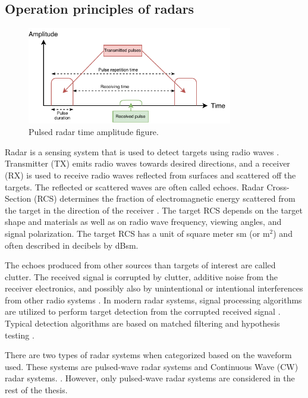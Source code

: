 \documentclass[english, 12pt, a4paper, elec, utf8, a-1b, online]{aaltothesis}
\begin{document}
\subsection{Operation principles of radars} \label{sec:radar_opertaion_principle}

\begin{figure}[htb]
    \centering
    \includegraphics[width=0.8\textwidth]{figures/background/pulsed_radar.pdf}
    \caption{Pulsed radar time amplitude figure.}
    \label{fig:pulsed_radar}
\end{figure}

Radar is a sensing system that is used to detect targets using radio waves \cite{Curry2011}.
Transmitter (TX) emits radio waves towards desired directions, and a receiver (RX) is used to receive radio waves reflected from surfaces and scattered off the targets. 
The reflected or scattered waves are often called echoes.
Radar Cross-Section (RCS) determines the fraction of electromagnetic energy scattered from the target in the direction of the receiver \cite{Curry2011}.
The target RCS depends on the target shape and materials as well as on radio wave frequency, viewing angles, and signal polarization.
The target RCS has a unit of square meter sm (or m$^2$) and often described in decibels by dBsm.

The echoes produced from other sources than targets of interest are called clutter.
The received signal is corrupted by clutter, additive noise from the receiver electronics, and possibly also by unintentional or intentional interferences from other radio systems \cite{Curry2011}.
In modern radar systems, signal processing algorithms are utilized to perform target detection from the corrupted received signal \cite{Mahafza2015}.
Typical detection algorithms are based on matched filtering and hypothesis testing \cite{Mahafza2015}.

There are two types of radar systems when categorized based on the waveform used.
These systems are pulsed-wave radar systems and Continuous Wave (CW) radar systems.  \cite{Mahafza2015}.
However, only pulsed-wave radar systems are considered in the rest of the thesis.
\end{document}
